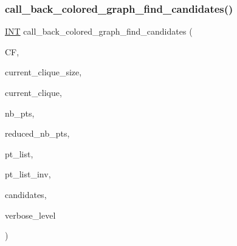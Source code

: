 \mbox{\label{rainbow__cliques_8_c_ac65506da6701dee30f21f03457d89987}} 
\subsubsection{\texorpdfstring{call\+\_\+back\+\_\+colored\+\_\+graph\+\_\+find\+\_\+candidates()}{call\_back\_colored\_graph\_find\_candidates()}}
{\footnotesize\ttfamily \mbox{\hyperlink{galois_8h_a09fddde158a3a20bd2dcadb609de11dc}{I\+NT}} call\+\_\+back\+\_\+colored\+\_\+graph\+\_\+find\+\_\+candidates (\begin{DoxyParamCaption}\item[{\mbox{\hyperlink{classclique__finder}{clique\+\_\+finder}} $\ast$}]{CF,  }\item[{\mbox{\hyperlink{galois_8h_a09fddde158a3a20bd2dcadb609de11dc}{I\+NT}}}]{current\+\_\+clique\+\_\+size,  }\item[{\mbox{\hyperlink{galois_8h_a09fddde158a3a20bd2dcadb609de11dc}{I\+NT}} $\ast$}]{current\+\_\+clique,  }\item[{\mbox{\hyperlink{galois_8h_a09fddde158a3a20bd2dcadb609de11dc}{I\+NT}}}]{nb\+\_\+pts,  }\item[{\mbox{\hyperlink{galois_8h_a09fddde158a3a20bd2dcadb609de11dc}{I\+NT}} \&}]{reduced\+\_\+nb\+\_\+pts,  }\item[{\mbox{\hyperlink{galois_8h_a09fddde158a3a20bd2dcadb609de11dc}{I\+NT}} $\ast$}]{pt\+\_\+list,  }\item[{\mbox{\hyperlink{galois_8h_a09fddde158a3a20bd2dcadb609de11dc}{I\+NT}} $\ast$}]{pt\+\_\+list\+\_\+inv,  }\item[{\mbox{\hyperlink{galois_8h_a09fddde158a3a20bd2dcadb609de11dc}{I\+NT}} $\ast$}]{candidates,  }\item[{\mbox{\hyperlink{galois_8h_a09fddde158a3a20bd2dcadb609de11dc}{I\+NT}}}]{verbose\+\_\+level }\end{DoxyParamCaption})}

